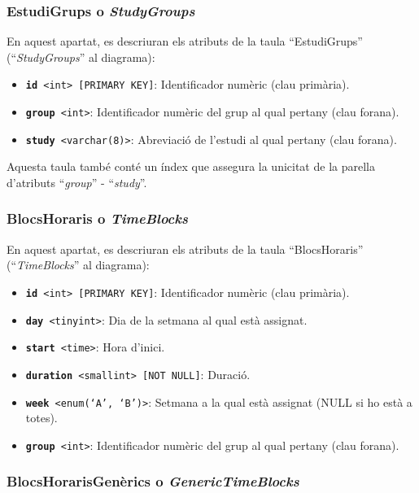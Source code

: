 \documentclass[a4paper,12pt]{ThesisStyle}
\begin{document}
\subsubsection{EstudiGrups o \textit{StudyGroups}}

En aquest apartat, es descriuran els atributs de la taula ``EstudiGrups'' (``\textit{StudyGroups}'' al diagrama):
\begin{itemize}
  \item \texttt{\textbf{id} <int> [PRIMARY KEY]}: Identificador numèric (clau primària).
  \item \texttt{\textbf{group} <int>}: Identificador numèric del grup al qual pertany (clau forana).
  \item \texttt{\textbf{study} <varchar(8)>}: Abreviació de l'estudi al qual pertany (clau forana).
\end{itemize}

Aquesta taula també conté un índex que assegura la unicitat de la parella d'atributs ``\textit{group}'' - ``\textit{study}''.

\subsubsection{BlocsHoraris o \textit{TimeBlocks}}

En aquest apartat, es descriuran els atributs de la taula ``BlocsHoraris'' (``\textit{TimeBlocks}'' al diagrama):
\begin{itemize}
  \item \texttt{\textbf{id} <int> [PRIMARY KEY]}: Identificador numèric (clau primària).
  \item \texttt{\textbf{day} <tinyint>}: Dia de la setmana al qual està assignat.
  \item \texttt{\textbf{start} <time>}: Hora d'inici.
  \item \texttt{\textbf{duration} <smallint> [NOT NULL]}: Duració.
  \item \texttt{\textbf{week} <enum(`A', `B')>}: Setmana a la qual està assignat (NULL si ho està a totes).
  \item \texttt{\textbf{group} <int>}: Identificador numèric del grup al qual pertany (clau forana).
\end{itemize}

\subsubsection{BlocsHorarisGenèrics o \textit{GenericTimeBlocks}}
\end{document}
